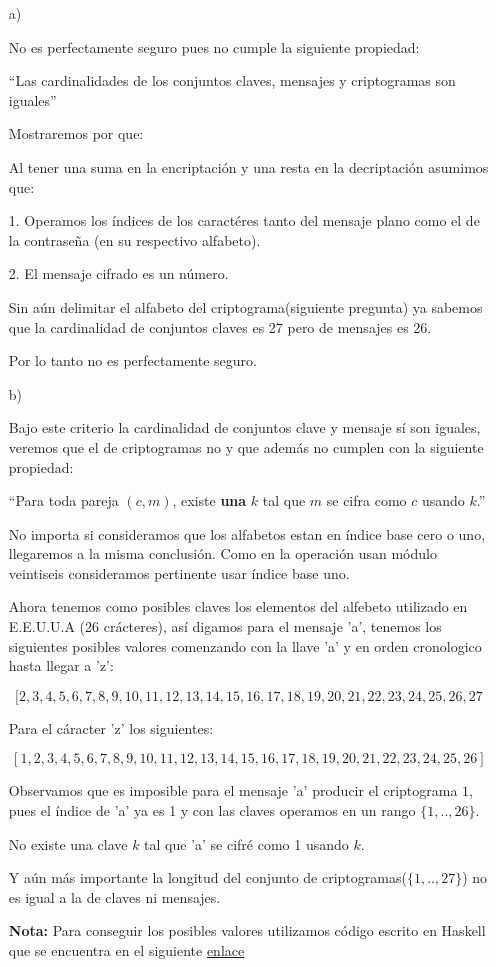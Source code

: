 \documentclass{article}
\begin{document}
\begin{enumerate}
\item[a)]

  No es perfectamente seguro pues no cumple la siguiente propiedad:

  ``Las cardinalidades de los conjuntos claves, mensajes y
  criptogramas son iguales''
  
  Mostraremos por que:
  
  Al tener una suma en la encriptación y una resta en la decriptación asumimos
  que:
  
  1. Operamos los índices de los caractéres tanto del mensaje plano como
  el de la contraseña (en su respectivo alfabeto).

  2. El mensaje cifrado es un número.

  Sin aún delimitar el alfabeto del criptograma(siguiente pregunta) ya sabemos
  que la cardinalidad de conjuntos claves es 27 pero de mensajes es 26.

  Por lo tanto no es perfectamente seguro.

\item[b)]
  
  Bajo este criterio la cardinalidad de conjuntos clave y mensaje sí son iguales,
  veremos que el de criptogramas no y que además no cumplen con la siguiente propiedad:

  ``Para toda pareja $(c, m)$, existe {\bf una} $k$ tal que $m$
  se cifra como $c$ usando $k$.''

  No importa si consideramos que los alfabetos estan en índice base cero o uno, llegaremos a
  la misma conclusión. Como en la operación usan módulo veintiseis consideramos
  pertinente usar índice base uno.

  Ahora tenemos como posibles claves los elementos del alfebeto utilizado en E.E.U.U.A
  (26 crácteres), así digamos para el mensaje 'a', tenemos los siguientes posibles valores
  comenzando con la llave 'a' y en orden cronologico hasta llegar a 'z':

  $$[2,3,4,5,6,7,8,9,10,11,12,13,14,15,16,17,18,19,20,21,22,23,24,25,26,27$$

  Para el cáracter 'z' los siguientes:

  $$[1,2,3,4,5,6,7,8,9,10,11,12,13,14,15,16,17,18,19,20,21,22,23,24,25,26]$$

  Observamos que es imposible para el mensaje 'a' producir el criptograma $1$, pues
  el índice de 'a' ya es 1 y con las claves operamos en un rango $\{1,..,26\}$.

  No existe una clave $k$ tal que 'a' se cifré como 1 usando $k$.

  Y aún más importante la longitud del conjunto de criptogramas($\{1,..,27\}$)
  no es igual a la de claves ni mensajes.

  {\bf *Nota:} Para conseguir los posibles valores utilizamos código escrito en
  Haskell que se encuentra en el siguiente
  \href{https://github.com/DiegoMendezMedina/Cripto-Seguridad/tree/main/Tareas/01/src/1.hs}{enlace}
\end{enumerate}
\end{document}
